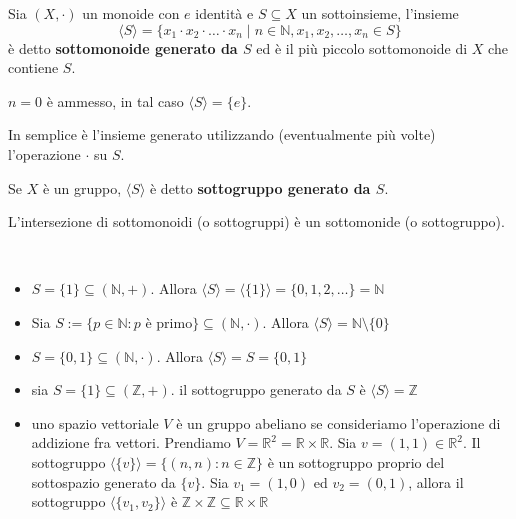 \documentclass[../main.tex]{subfiles}
\begin{document}
\begin{definition}
    Sia $(X, \cdot)$ un monoide con $e$ identità e $S \subseteq X$ un sottoinsieme, l'insieme
    \[
        \boxed{
            \langle S \rangle = \{ x_1 \cdot x_2 \cdot \ldots \cdot x_n \mid n \in \mathbb{N}, x_1,x_2,\ldots,x_n \in S \}
        }
    \]
    è detto \textbf{sottomonoide generato da $S$} ed è il più piccolo sottomonoide di $X$ che contiene $S$.
    \begin{note}
        $n = 0$ è ammesso, in tal caso $\langle S \rangle = \{e\}$.
    \end{note}
    In semplice è l'insieme generato utilizzando (eventualmente più volte) l'operazione $\cdot$ su $S$.

    Se $X$ è un gruppo, $\langle S \rangle$ è detto \textbf{sottogruppo generato da $S$}.
\end{definition}
\begin{remark}
    L'intersezione di sottomonoidi (o sottogruppi) è un sottomonide (o sottogruppo).
\end{remark}

\begin{example}
    \
    \begin{itemize}
        \item $S = \{1\} \subseteq  (\mathbb{N}, +)$. Allora $\langle S \rangle = \langle \{1\} \rangle = \{0,1,2,\ldots\} = \mathbb{N}$
        \item Sia $S:= \{p \in \mathbb{N} : p \text{ è primo}\} \subseteq (\mathbb{N}, \cdot)$. Allora $\langle S \rangle = \mathbb{N} \setminus \{0\}$
        \item $S = \{0,1\} \subseteq (\mathbb{N} , \cdot)$. Allora $\langle S \rangle = S = \{0,1\}$
        \item sia $S = \{1\} \subseteq  (\mathbb{Z}, +)$. il sottogruppo generato da $S$ è $\langle S \rangle  = \mathbb{Z}$
        \item uno spazio vettoriale $V$ è un gruppo abeliano se consideriamo l'operazione di addizione fra vettori. Prendiamo $V=\mathbb{R}^2 = \mathbb{R} \times \mathbb{R}$. Sia $v = (1,1) \in \mathbb{R}^2$. Il sottogruppo $\langle \{v\} \rangle = \{(n,n): n \in \mathbb{Z}\}$ è un sottogruppo proprio del sottospazio generato da $\{v\}$. Sia $v_1 = (1,0)$ ed $v_2 = (0,1)$, allora il sottogruppo $\langle \{v_1,v_2\} \rangle$ è $\mathbb{Z} \times \mathbb{Z} \subseteq  \mathbb{R} \times \mathbb{R}$
    \end{itemize}
\end{example}
\end{document}

